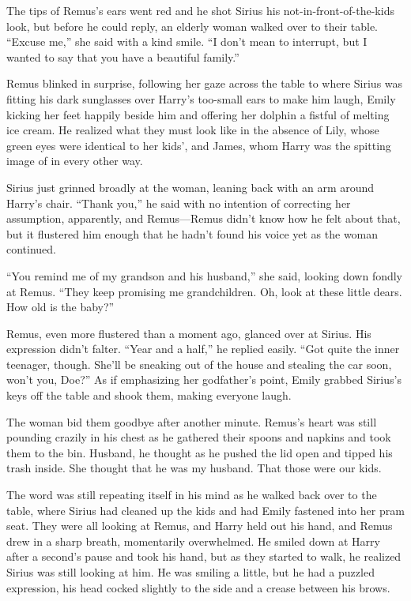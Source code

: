 The tips of Remus’s ears went red and he shot Sirius his not-in-front-of-the-kids look, but before he could reply, an elderly woman walked over to their table. “Excuse me,” she said with a kind smile. “I don’t mean to interrupt, but I wanted to say that you have a beautiful family.”

Remus blinked in surprise, following her gaze across the table to where Sirius was fitting his dark sunglasses over Harry’s too-small ears to make him laugh, Emily kicking her feet happily beside him and offering her dolphin a fistful of melting ice cream. He realized what they must look like in the absence of Lily, whose green eyes were identical to her kids’, and James, whom Harry was the spitting image of in every other way.

Sirius just grinned broadly at the woman, leaning back with an arm around Harry’s chair. “Thank you,” he said with no intention of correcting her assumption, apparently, and Remus—Remus didn’t know how he felt about that, but it flustered him enough that he hadn’t found his voice yet as the woman continued.

“You remind me of my grandson and his husband,” she said, looking down fondly at Remus. “They keep promising me grandchildren. Oh, look at these little dears. How old is the baby?”

Remus, even more flustered than a moment ago, glanced over at Sirius. His expression didn’t falter. “Year and a half,” he replied easily. “Got quite the inner teenager, though. She’ll be sneaking out of the house and stealing the car soon, won’t you, Doe?” As if emphasizing her godfather’s point, Emily grabbed Sirius’s keys off the table and shook them, making everyone laugh.

The woman bid them goodbye after another minute. Remus’s heart was still pounding crazily in his chest as he gathered their spoons and napkins and took them to the bin. Husband, he thought as he pushed the lid open and tipped his trash inside. She thought that he was my husband. That those were our kids.

The word was still repeating itself in his mind as he walked back over to the table, where Sirius had cleaned up the kids and had Emily fastened into her pram seat. They were all looking at Remus, and Harry held out his hand, and Remus drew in a sharp breath, momentarily overwhelmed. He smiled down at Harry after a second’s pause and took his hand, but as they started to walk, he realized Sirius was still looking at him. He was smiling a little, but he had a puzzled expression, his head cocked slightly to the side and a crease between his brows.

